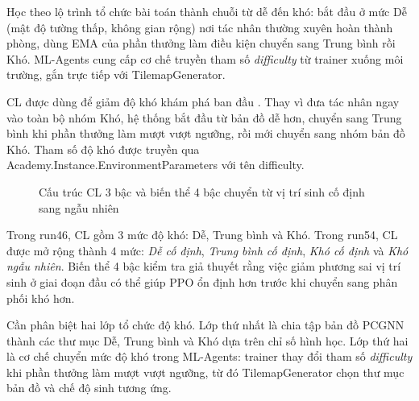Học theo lộ trình tổ chức bài toán thành chuỗi từ dễ đến khó: bắt đầu ở mức Dễ (mật độ tường thấp, không gian rộng) nơi tác nhân thường xuyên hoàn thành phòng, dùng EMA của phần thưởng làm điều kiện chuyển sang Trung bình rồi Khó. ML-Agents cung cấp cơ chế truyền tham số \emph{difficulty} từ trainer xuống môi trường, gắn trực tiếp với TilemapGenerator.

CL được dùng để giảm độ khó khám phá ban đầu \cite{Bengio2009}. Thay vì đưa tác nhân ngay vào toàn bộ nhóm Khó, hệ thống bắt đầu từ bản đồ dễ hơn, chuyển sang Trung bình khi phần thưởng làm mượt vượt ngưỡng, rồi mới chuyển sang nhóm bản đồ Khó. Tham số độ khó được truyền qua Academy.Instance.EnvironmentParameters với tên difficulty.

\begin{figure}[H]
    \centering
    \caption{Cấu trúc CL 3 bậc và biến thể 4 bậc chuyển từ vị trí sinh cố định sang ngẫu nhiên}
    \label{fig:curriculum_structure}
\end{figure}

Trong run46, CL gồm 3 mức độ khó: Dễ, Trung bình và Khó. Trong run54, CL được mở rộng thành 4 mức: \emph{Dễ cố định}, \emph{Trung bình cố định}, \emph{Khó cố định} và \emph{Khó ngẫu nhiên}. Biến thể 4 bậc kiểm tra giả thuyết rằng việc giảm phương sai vị trí sinh ở giai đoạn đầu có thể giúp PPO ổn định hơn trước khi chuyển sang phân phối khó hơn.

Cần phân biệt hai lớp tổ chức độ khó. Lớp thứ nhất là chia tập bản đồ PCGNN thành các thư mục Dễ, Trung bình và Khó dựa trên chỉ số hình học. Lớp thứ hai là cơ chế chuyển mức độ khó trong ML-Agents: trainer thay đổi tham số \emph{difficulty} khi phần thưởng làm mượt vượt ngưỡng, từ đó TilemapGenerator chọn thư mục bản đồ và chế độ sinh tương ứng.


